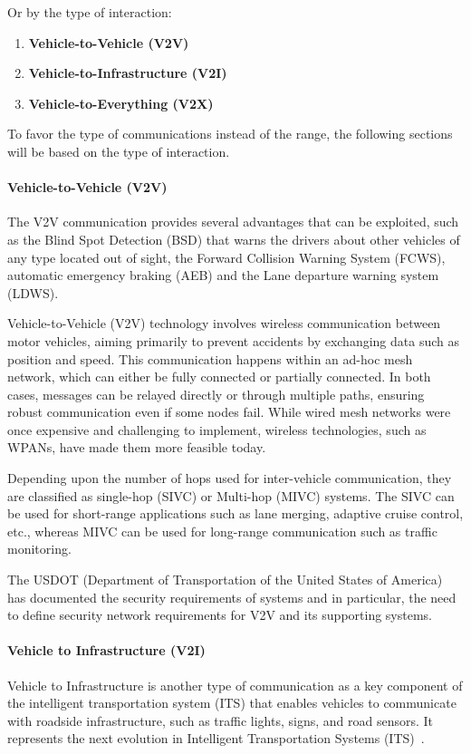 Or by the type of interaction:
\begin{enumerate}
    \item \textbf{Vehicle-to-Vehicle (V2V)}
    \item \textbf{Vehicle-to-Infrastructure (V2I)}
    \item \textbf{Vehicle-to-Everything (V2X)}
\end{enumerate}

To favor the type of communications instead of the range, the following sections will be based on the type of interaction.

\paragraph{Vehicle-to-Vehicle (V2V)}

The V2V communication provides several advantages that can be exploited, such as the Blind Spot Detection (BSD) that warns the drivers about other vehicles of any type located out of sight,
the Forward Collision Warning System (FCWS), automatic emergency braking (AEB) and the Lane departure warning system (LDWS)\cite{arena2019overview}.

Vehicle-to-Vehicle (V2V) technology involves wireless communication between motor vehicles, aiming primarily to prevent accidents by exchanging data such as position and speed.
This communication happens within an ad-hoc mesh network, which can either be fully connected or partially connected.
In both cases, messages can be relayed directly or through multiple paths, ensuring robust communication even if some nodes fail.
While wired mesh networks were once expensive and challenging to implement, wireless technologies, such as WPANs, have made them more feasible today\cite{arena2019overview}.

Depending upon the number of hops used for inter-vehicle communication, they are classified as single-hop (SIVC) or
Multi-hop (MIVC) systems.
The SIVC can be used for short-range applications such as
lane merging, adaptive cruise control, etc., whereas MIVC can be used for long-range communication such as traffic monitoring\cite{zheng2020cooperative}.

The USDOT (Department of Transportation of the United States of America) has documented the security requirements of
systems and in particular, the need to define security network requirements for V2V and its supporting systems\cite{dot2021v2v}.

\paragraph{Vehicle to Infrastructure (V2I)}
Vehicle to Infrastructure is another type of communication as a key component of the intelligent transportation system (ITS)
that enables vehicles to communicate with roadside infrastructure, such as traffic lights, signs, and road sensors.
It represents the next evolution in Intelligent Transportation Systems (ITS)~\cite{dot2024v2i}.

